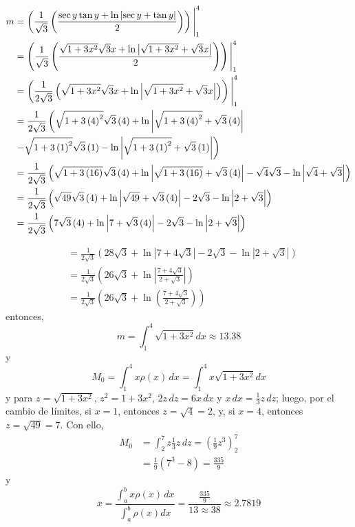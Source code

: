 \begin{gather*}
\begin{aligned}
  m&=\left( \frac{1}{\sqrt{3}}\left( \frac{\sec y\tan y+\ln \left\vert \sec
  y+\tan y\right\vert }{2}\right) \right)\Bigg\vert_{1}^{4}\\
  &=\left( \frac{1}{\sqrt{3}}\left( \frac{\sqrt{1+3x^{2}}\sqrt{3}x+\ln
  \left\vert \sqrt{1+3x^{2}}+\sqrt{3}x\right\vert }{2}\right) \right)\Bigg\vert _{1}^{4}\\
  &=\left( \frac{1}{2\sqrt{3}}\left( \sqrt{1+3x^{2}}\sqrt{3}x+\ln \left\vert
  \sqrt{1+3x^{2}}+\sqrt{3}x\right\vert \right) \right)\Bigg\vert _{1}^{4}\\
  &=\frac{1}{2\sqrt{3}}\left( \sqrt{1+3\left( 4\right) ^{2}}\sqrt{3}\left(
    4\right) +\ln \left\vert \sqrt{1+3\left( 4\right) ^{2}}+\sqrt{3}\left(
    4\right) \right\vert\right.\\
    &\left. -\sqrt{1+3\left( 1\right) ^{2}}\sqrt{3}\left( 1\right)
    -\ln \left\vert \sqrt{1+3\left( 1\right) ^{2}}+\sqrt{3}\left( 1\right)
  \right\vert \right)\\
  &=\frac{1}{2\sqrt{3}}\left( \sqrt{1+3\left( 16\right) ^{{}}}\sqrt{3}\left(
    4\right) +\ln \left\vert \sqrt{1+3\left( 16\right) ^{{}}}+\sqrt{3}\left(
    4\right) \right\vert -\sqrt{4}\sqrt{3}-\ln \left\vert \sqrt{4}+\sqrt{3}%
  \right\vert \right) \\
  &=\frac{1}{2\sqrt{3}}\left( \sqrt{49^{{}}}\sqrt{3}\left( 4\right) +\ln
    \left\vert \sqrt{49^{{}}}+\sqrt{3}\left( 4\right) \right\vert -2\sqrt{3}-\ln
  \left\vert 2+\sqrt{3}\right\vert \right) \\
  &=\frac{1}{2\sqrt{3}}\left( 7\sqrt{3}\left( 4\right) +\ln \left\vert 7+\sqrt{%
    3}\left( 4\right) \right\vert -2\sqrt{3}-\ln \left\vert 2+\sqrt{3}%
  \right\vert \right)
\end{aligned}
\end{gather*}

\begin{align*}
&=\frac{1}{2\sqrt{3}}\left( 28\sqrt{3}+\ln \left\vert 7+4\sqrt{3}\right\vert-2\sqrt{3}-\ln \left\vert 2+\sqrt{3}\right\vert \right)\\
& =\frac{1}{2\sqrt{3}}\left( 26\sqrt{3}+\ln \left\vert \frac{7+4\sqrt{3}}{2+\sqrt{3}}\right\vert\right) \\
&=\frac{1}{2\sqrt{3}}\left( 26\sqrt{3}+\ln \left( \frac{7+4\sqrt{3}}{2+\sqrt{3}}\right) \right)
\end{align*}
entonces,
\[
m=\int_{1}^{4}\sqrt{1+3x^{2}}dx\approx13.38
\]
y
\[
M_{0}=\int_{1}^{4}x\rho \left( x\right)\,dx=\int_{1}^{4}x\sqrt{1+3x^{2}}dx
\]
y para $z=\sqrt{1+3x^{2}}$, $z^{2}=1+3x^{2}$, $2z\,dz=6x\,dx$ y $x\,dx=\frac{1}{3}z\,dz$; luego, por el cambio de límites, si $x=1$, entonces $z=\sqrt{4}=2$, y, si $x=4$, entonces $z=\sqrt{49}=7$. Con ello,
\begin{align*}
M_{0}&=\int_{2}^{7}z\frac{1}{3}z\,dz=\left( \frac{1}{9}z^{3}\right) _{2}^{7}\\
&=\frac{1}{9}\left( 7^{3}-8\right) =\frac{335}{9}
\end{align*}
y
\[
\overline{x}=\frac{\int_{a}^{b}x\rho \left( x\right)\,dx}{\int_{a}^{b}\rho \left( x\right)
dx}=\frac{\frac{335}{9}}{13\approx 38}\approx 2.7819
\]

